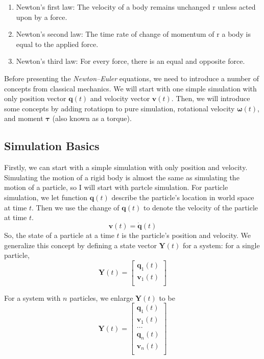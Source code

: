 \begin{enumerate}
    \item Newton’s first law: The velocity of a body remains unchanged r unless acted upon by a force.
    \item Newton’s second law: The time rate of change of momentum of r a body is equal to the applied force.
    \item Newton’s third law: For every force, there is an equal and opposite force.
\end{enumerate}

Before presenting the \textit{Newton–Euler} equations, we need to introduce a number of concepts from classical mechanics. We will start with one simple simulation with only position vector $\pmb{q}(t)$ and velocity vector $\pmb{v}(t)$. Then, we will introduce some concepts by adding rotatiopn to pure simulation, rotational velocity $\pmb{\omega}(t)$, and moment $\pmb{\tau}$ (also known as a torque).


\subsection{Simulation Basics}

Firstly, we can start with a simple simulation with only position and velocity. Simulating the motion of a rigid body is almost the same as simulating the motion of a particle, so I will start with partcle simulation. For particle simulation, we let function $\pmb{q}(t)$ describe the particle's location in world space at time $t$. Then we use the change of $\pmb{q}(t)$
to denote the velocity of the particle at time $t$. 
\begin{equation}
    \pmb{v}(t) = \dot{\pmb{q}}(t)
\end{equation}
So, the state of a particle at a time $t$ is the particle's position and velocity. We generalize this concept by defining a state vector $\textbf{Y}(t)$ for a system: for a single particle,
\begin{equation}
    \textbf{Y}(t) = \left[
        \begin{array}{c}
            \pmb{q}_{1}(t) \\
            \pmb{v}_{1}(t) \\
        \end{array}
    \right]
\end{equation}

For a system with $n$ particles, we enlarge $\textbf{Y}(t)$ to be
\begin{equation}
    \textbf{Y}(t) = \left[
    \begin{array}{c}
        \pmb{q}_{1}(t) \\
        \pmb{v}_{1}(t) \\
        ... \\
        \pmb{q}_{n}(t) \\
        \pmb{v}_{n}(t) \\
    \end{array}
    \right]
\end{equation}

